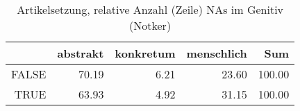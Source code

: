 \begin{table}[ht]
\centering
\begin{tabular}{rrrrr}
  \hline
 & abstrakt & konkretum & menschlich & Sum \\ 
  \hline
FALSE & 70.19 & 6.21 & 23.60 & 100.00 \\ 
  TRUE & 63.93 & 4.92 & 31.15 & 100.00 \\ 
   \hline
\end{tabular}
\caption{Artikelsetzung, relative Anzahl (Zeile) NAs im Genitiv (Notker)} 
\end{table}
